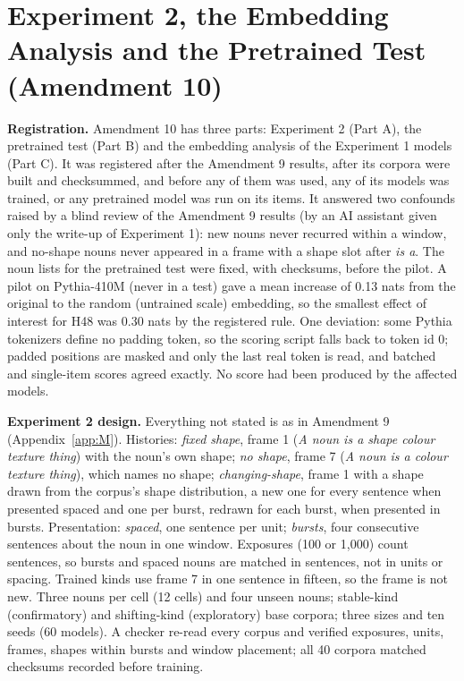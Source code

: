 \FloatBarrier
\section{Experiment 2, the Embedding Analysis and the Pretrained Test (Amendment 10)}\label{app:N}
\setcounter{table}{0}
\setcounter{figure}{0}
\textbf{Registration.} Amendment 10 has three parts: Experiment 2 (Part A), the pretrained test (Part B) and the embedding analysis of the Experiment 1 models (Part C). It was registered after the Amendment 9 results, after its corpora were built and checksummed, and before any of them was used, any of its models was trained, or any pretrained model was run on its items. It answered two confounds raised by a blind review of the Amendment 9 results (by an AI assistant given only the write-up of Experiment 1): new nouns never recurred within a window, and no-shape nouns never appeared in a frame with a shape slot after \emph{is a}. The noun lists for the pretrained test were fixed, with checksums, before the pilot. A pilot on Pythia-410M (never in a test) gave a mean increase of 0.13 nats from the original to the random (untrained scale) embedding, so the smallest effect of interest for H48 was 0.30 nats by the registered rule. One deviation: some Pythia tokenizers define no padding token, so the scoring script falls back to token id 0; padded positions are masked and only the last real token is read, and batched and single-item scores agreed exactly. No score had been produced by the affected models.

\textbf{Experiment 2 design.} Everything not stated is as in Amendment 9 (Appendix~\ref{app:M}). Histories: \emph{fixed shape}, frame 1 (\emph{A \textit{noun} is a \textit{shape} \textit{colour} \textit{texture} thing}) with the noun's own shape; \emph{no shape}, frame 7 (\emph{A \textit{noun} is a \textit{colour} \textit{texture} thing}), which names no shape; \emph{changing-shape}, frame 1 with a shape drawn from the corpus's shape distribution, a new one for every sentence when presented spaced and one per burst, redrawn for each burst, when presented in bursts. Presentation: \emph{spaced}, one sentence per unit; \emph{bursts}, four consecutive sentences about the noun in one window. Exposures (100 or 1,000) count sentences, so bursts and spaced nouns are matched in sentences, not in units or spacing. Trained kinds use frame 7 in one sentence in fifteen, so the frame is not new. Three nouns per cell (12 cells) and four unseen nouns; stable-kind (confirmatory) and shifting-kind (exploratory) base corpora; three sizes and ten seeds (60 models). A checker re-read every corpus and verified exposures, units, frames, shapes within bursts and window placement; all 40 corpora matched checksums recorded before training.

